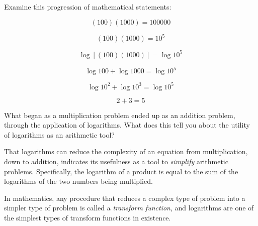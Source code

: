 

Examine this progression of mathematical statements:

$$(100)(1000) = 100000$$

$$(100)(1000) = 10^5$$

$$\log [(100)(1000)] = \log 10^5$$

$$\log 100 + \log 1000 = \log 10^5$$

$$\log 10^2 + \log 10^3 = \log 10^5$$

$$2 + 3 = 5$$

What began as a multiplication problem ended up as an addition problem, through the application of logarithms.  What does this tell you about the utility of logarithms as an arithmetic tool?







That logarithms can reduce the complexity of an equation from multiplication, down to addition, indicates its usefulness as a tool to {\it simplify} arithmetic problems.  Specifically, the logarithm of a product is equal to the sum of the logarithms of the two numbers being multiplied.







In mathematics, any procedure that reduces a complex type of problem into a simpler type of problem is called a {\it transform function}, and logarithms are one of the simplest types of transform functions in existence.




